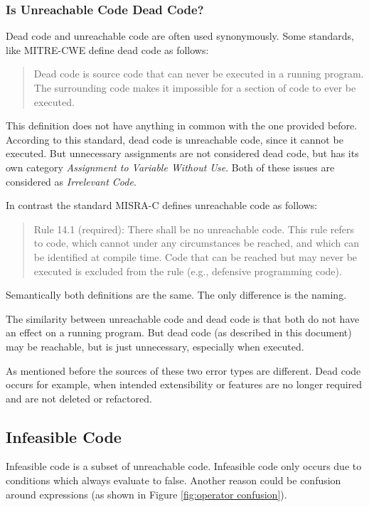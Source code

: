 \subsubsection{Is Unreachable Code Dead Code?}
Dead code and unreachable code are often used synonymously. 
Some standards, like MITRE-CWE \cite{CWECWE561Dead} define dead code as follows:
\begin{quote}
	Dead code is source code that can never be executed in a running program. The surrounding code makes it impossible for a section of code to ever be executed.
\end{quote}
This definition does not have anything in common with the one provided before. According to this standard, dead code is unreachable code, since it cannot be executed. But unnecessary assignments are not considered dead code, but has its own category \emph{Assignment to Variable Without Use}.
Both of these issues are considered as \emph{Irrelevant Code}.

In contrast the standard MISRA-C \cite{motorindustrysoftwarereliabilityassociationMISRAC2004Guidelines2008} defines unreachable code as follows:
\begin{quote}
	Rule 14.1 (required): There shall be no unreachable code.
	This  rule  refers  to  code,  which  cannot  under  any  circumstances  be  reached,  and  which  can  be 
	identified at compile time. Code that can be reached but may never be executed is excluded 
	from the rule (e.g., defensive programming code).	
\end{quote}
Semantically both definitions are the same. The only difference is the naming.


The similarity between unreachable code and dead code is that both do not have an effect on a running program. But dead code (as described in this document) may be reachable, but is just unnecessary, especially when executed. 


As mentioned before the sources of these two error types are different.
Dead code occurs for example, when intended extensibility or features are no longer required and are not deleted or refactored.
\subsection{Infeasible Code}
\label{sub:infeasible code}
Infeasible code is a subset of unreachable code.
Infeasible code only occurs due to conditions which always evaluate to false. Another reason could be confusion around expressions \cite{Eichberg_2015} (as shown in Figure \ref{fig:operator confusion}).


